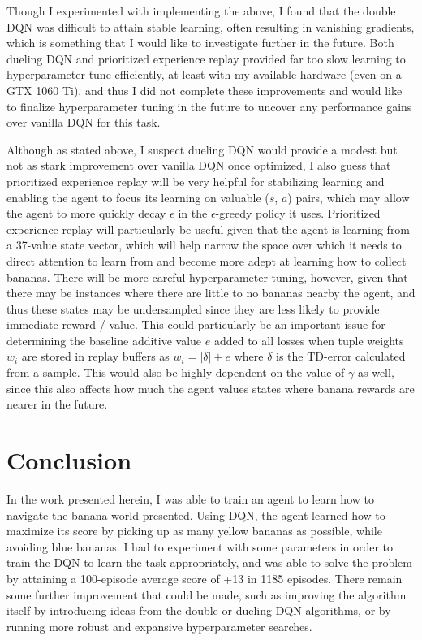 \documentclass[11pt]{article}
\begin{document}
Though I experimented with implementing the above, I found that the double DQN was difficult to attain stable learning, often resulting in vanishing gradients, which is something that I would like to investigate further in the future. Both dueling DQN and prioritized experience replay provided far too slow learning to hyperparameter tune efficiently, at least with my available hardware (even on a GTX 1060 Ti), and thus I did not complete these improvements and would like to finalize hyperparameter tuning in the future to uncover any performance gains over vanilla DQN for this task.

Although as stated above, I suspect dueling DQN would provide a modest but not as stark improvement over vanilla DQN once optimized, I also guess that prioritized experience replay will be very helpful for stabilizing learning and enabling the agent to focus its learning on valuable ($s$, $a$) pairs, which may allow the agent to more quickly decay $\epsilon$ in the $\epsilon$-greedy policy it uses. Prioritized experience replay will particularly be useful given that the agent is learning from a 37-value state vector, which will help narrow the space over which it needs to direct attention to learn from and become more adept at learning how to collect bananas. There will be more careful hyperparameter tuning, however, given that there may be instances where there are little to no bananas nearby the agent, and thus these states may be undersampled since they are less likely to provide immediate reward / value. This could particularly be an important issue for determining the baseline additive value $e$ added to all losses when tuple weights $w_i$ are stored in replay buffers as $w_i = |\delta| + e$ where $\delta$ is the TD-error calculated from a sample. This would also be highly dependent on the value of $\gamma$ as well, since this also affects how much the agent values states where banana rewards are nearer in the future.

\section{Conclusion}

In the work presented herein, I was able to train an agent to learn how to navigate the banana world presented. Using DQN, the agent learned how to maximize its score by picking up as many yellow bananas as possible, while avoiding blue bananas. I had to experiment with some parameters in order to train the DQN to learn the task appropriately, and was able to solve the problem by attaining a 100-episode average score of +13 in 1185 episodes. There remain some further improvement that could be made, such as improving the algorithm itself by introducing ideas from the double or dueling DQN algorithms, or by running more robust and expansive hyperparameter searches.



\end{document}
